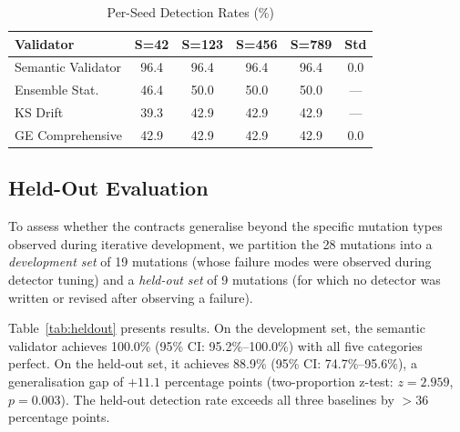 \documentclass[journal]{IEEEtran}
\begin{document}
\begin{table}[!t]
\renewcommand{\arraystretch}{1.15}
\caption{Per-Seed Detection Rates (\%)}
\label{tab:seeds}
\centering
\begin{tabular}{lccccc}
\toprule
\textbf{Validator} & \textbf{S=42} & \textbf{S=123} &
  \textbf{S=456} & \textbf{S=789} & \textbf{Std} \\
\midrule
Semantic Validator & 96.4 & 96.4 & 96.4 & 96.4 & 0.0 \\
Ensemble Stat.     & 46.4 & 50.0 & 50.0 & 50.0 & --- \\
KS Drift           & 39.3 & 42.9 & 42.9 & 42.9 & --- \\
GE Comprehensive   & 42.9 & 42.9 & 42.9 & 42.9 & 0.0 \\
\bottomrule
\end{tabular}
\end{table}

\subsection{Held-Out Evaluation}

To assess whether the contracts generalise beyond the specific mutation
types observed during iterative development, we partition the 28 mutations
into a \emph{development set} of 19 mutations (whose failure modes were
observed during detector tuning) and a \emph{held-out set} of 9 mutations
(for which no detector was written or revised after observing a failure).

Table~\ref{tab:heldout} presents results.  On the development set, the
semantic validator achieves 100.0\% (95\% CI: 95.2\%--100.0\%) with all
five categories perfect.  On the held-out set, it achieves 88.9\% (95\% CI:
74.7\%--95.6\%), a generalisation gap of $+11.1$ percentage points
(two-proportion z-test: $z = 2.959$, $p = 0.003$).  The held-out detection
rate exceeds all three baselines by $>$36 percentage points.
\end{document}
